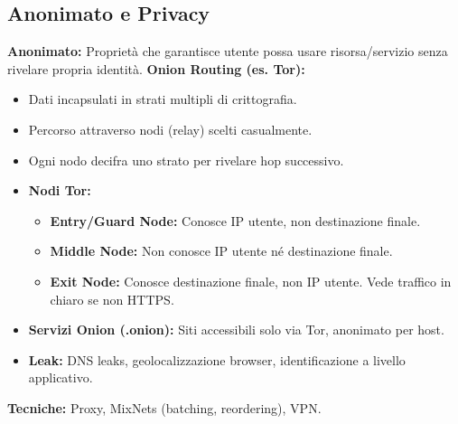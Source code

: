 \documentclass[10pt,a4paper]{article}
\begin{document}
\begin{multicols}{2}
\columnbreak

\section*{Anonimato e Privacy}
\textbf{Anonimato:} Proprietà che garantisce utente possa usare risorsa/servizio senza rivelare propria identità.
\textbf{Onion Routing (es. Tor):}
\begin{itemize}
    \item Dati incapsulati in strati multipli di crittografia.
    \item Percorso attraverso nodi (relay) scelti casualmente.
    \item Ogni nodo decifra uno strato per rivelare hop successivo.
    \item \textbf{Nodi Tor:}
    \begin{itemize}
        \item \textbf{Entry/Guard Node:} Conosce IP utente, non destinazione finale.
        \item \textbf{Middle Node:} Non conosce IP utente né destinazione finale.
        \item \textbf{Exit Node:} Conosce destinazione finale, non IP utente. Vede traffico in chiaro se non HTTPS.
    \end{itemize}
    \item \textbf{Servizi Onion (.onion):} Siti accessibili solo via Tor, anonimato per host.
    \item \textbf{Leak:} DNS leaks, geolocalizzazione browser, identificazione a livello applicativo.
\end{itemize}
\textbf{Tecniche:} Proxy, MixNets (batching, reordering), VPN.


\end{multicols}
\end{document}
